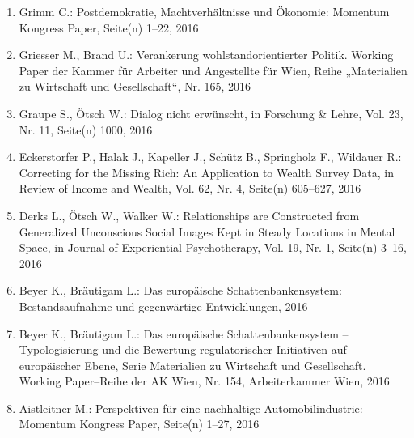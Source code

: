 \begin{enumerate}
	 \item Grimm C.: Postdemokratie, Machtverhältnisse und Ökonomie: Momentum Kongress Paper, Seite(n) 1--22, 2016
	 \item Griesser M., Brand U.: Verankerung wohlstandorientierter Politik. Working Paper der Kammer für Arbeiter und Angestellte für Wien, Reihe „Materialien zu Wirtschaft und Gesellschaft“, Nr. 165, 2016
	 \item Graupe S., Ötsch W.: Dialog nicht erwünscht, in Forschung \& Lehre, Vol. 23, Nr. 11, Seite(n) 1000, 2016
	 \item Eckerstorfer P., Halak J., Kapeller J., Schütz B., Springholz F., Wildauer R.: Correcting for the Missing Rich: An Application to Wealth Survey Data, in Review of Income and Wealth, Vol. 62, Nr. 4, Seite(n) 605--627, 2016
	 \item Derks L., Ötsch W., Walker W.: Relationships are Constructed from Generalized Unconscious Social Images Kept in Steady Locations in Mental Space, in Journal of Experiential Psychotherapy, Vol. 19, Nr. 1, Seite(n) 3--16, 2016
	 \item Beyer K., Bräutigam L.: Das europäische Schattenbankensystem: Bestandsaufnahme und gegenwärtige Entwicklungen, 2016
	 \item Beyer K., Bräutigam L.: Das europäische Schattenbankensystem – Typologisierung und die Bewertung regulatorischer Initiativen auf europäischer Ebene, Serie Materialien zu Wirtschaft und Gesellschaft. Working Paper--Reihe der AK Wien, Nr. 154, Arbeiterkammer Wien, 2016
	 \item Aistleitner M.: Perspektiven für eine nachhaltige Automobilindustrie: Momentum Kongress Paper, Seite(n) 1--27, 2016
\end{enumerate}
